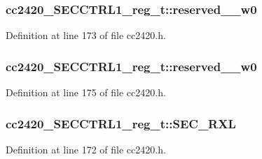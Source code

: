 \subsubsection[{\texorpdfstring{reserved\+\_\+1\+\_\+w0}{reserved_1_w0}}]{ cc2420\+\_\+\+S\+E\+C\+C\+T\+R\+L1\+\_\+reg\+\_\+t\+::reserved\+\_\+\_\+w0}\hypertarget{structcc2420___s_e_c_c_t_r_l1__reg__t_a9d8781e5a2ab0b77adddc7e5c5eb58f9}{}\label{structcc2420___s_e_c_c_t_r_l1__reg__t_a9d8781e5a2ab0b77adddc7e5c5eb58f9}


Definition at line 173 of file cc2420.\+h.

\subsubsection[{\texorpdfstring{reserved\+\_\+2\+\_\+w0}{reserved_2_w0}}]{ cc2420\+\_\+\+S\+E\+C\+C\+T\+R\+L1\+\_\+reg\+\_\+t\+::reserved\+\_\+\_\+w0}\hypertarget{structcc2420___s_e_c_c_t_r_l1__reg__t_a30e756e5151bbaf48d143602b9a6754c}{}\label{structcc2420___s_e_c_c_t_r_l1__reg__t_a30e756e5151bbaf48d143602b9a6754c}


Definition at line 175 of file cc2420.\+h.

\subsubsection[{\texorpdfstring{S\+E\+C\+\_\+\+R\+XL}{SEC_RXL}}]{ cc2420\+\_\+\+S\+E\+C\+C\+T\+R\+L1\+\_\+reg\+\_\+t\+::\+S\+E\+C\+\_\+\+R\+XL}\hypertarget{structcc2420___s_e_c_c_t_r_l1__reg__t_abeb216b3db6b6483699cb27ac85e03f8}{}\label{structcc2420___s_e_c_c_t_r_l1__reg__t_abeb216b3db6b6483699cb27ac85e03f8}


Definition at line 172 of file cc2420.\+h.

